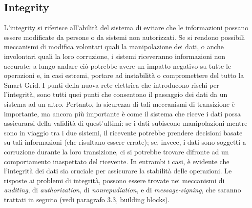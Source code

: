 \subsection{Integrity}
L'integrity si riferisce all'abilità del sistema di evitare che le informazioni possano essere modificate da persone o da sistemi non autorizzati. \newline Se si rendono possibili meccanismi di modifica volontari quali la manipolazione dei dati, o anche involontari quali la loro corruzione, i sistemi riceveranno informazioni non accurate; a lungo andare ciò potrebbe avere un impatto negativo su tutte le operazioni e, in casi estremi, portare ad instabilità o compromettere del tutto la Smart Grid. \newline
I punti della nuova rete elettrica che introducono rischi per l'integrità, sono tutti quei punti che consentono il passaggio dei dati da un sistema ad un altro. Pertanto, la sicurezza di tali meccanismi di transizione è importante, ma ancora più importante è come il sistema che riceve i dati possa assicurarsi della validità di quest'ultimi: se i dati subiscono manipolazioni mentre sono in viaggio tra i due sistemi, il ricevente potrebbe prendere decisioni basate su tali informazioni (che risultano essere errate); se, invece, i dati sono soggetti a corruzione durante la loro transizione, ci si potrebbe trovare difronte ad un comportamento inaspettato del ricevente. In entrambi i casi, è evidente che l'integrità dei dati sia cruciale per assicurare la stabilità delle operazioni.   \newline
Le risposte ai problemi di integrità, possono essere trovate nei meccanismi di \textit{auditing}, di \textit{authorization}, di \textit{nonrepudiation}, e di \textit{message-signing}, che saranno trattati in seguito (vedi paragrafo 3.3, building blocks).


